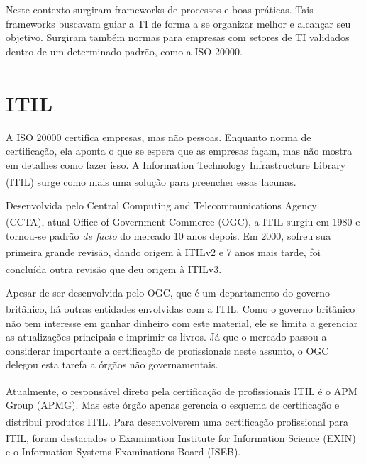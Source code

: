 Neste contexto surgiram frameworks de processos e boas práticas. Tais
frameworks buscavam guiar a TI de forma a se organizar melhor e alcançar seu
objetivo. Surgiram também normas para empresas com setores de TI validados
dentro de um determinado padrão, como a ISO 20000.
%

\section{ITIL\textsuperscript{\textregistered}}
\label{sec:intro:itil}

A ISO 20000 certifica empresas, mas não pessoas. Enquanto norma de
certificação, ela aponta o que se espera que as empresas façam, mas não mostra
em detalhes como fazer isso. A Information Technology Infrastructure Library
(ITIL\textsuperscript{\textregistered}) surge como mais uma solução para
preencher essas lacunas.
%

Desenvolvida pelo Central Computing and Telecommunications Agency\\ (CCTA),
atual Office of Government Commerce (OGC), a
ITIL\textsuperscript{\textregistered} surgiu em 1980 e tornou-se padrão
\emph{de facto} do mercado 10 anos depois. Em 2000, sofreu sua primeira grande
revisão, dando origem à ITIL\textsuperscript{\textregistered}v2 e 7 anos mais
tarde, foi concluída outra revisão que deu origem à
ITIL\textsuperscript{\textregistered}v3.
%
%

Apesar de ser desenvolvida pelo OGC, que é um departamento do governo
britânico, há outras entidades envolvidas com a
ITIL\textsuperscript{\textregistered}. Como o governo britânico não tem
interesse em ganhar dinheiro com este material, ele se limita a gerenciar as
atualizações principais e imprimir os livros. Já que o mercado passou a
considerar importante a certificação de profissionais neste assunto, o OGC
delegou esta tarefa a órgãos não governamentais.

Atualmente, o responsável direto pela certificação de profissionais
ITIL\textsuperscript{\textregistered} é o APM Group (APMG). Mas este órgão
apenas gerencia o esquema de certificação e distribui produtos
ITIL\textsuperscript{\textregistered}. Para desenvolverem uma certificação
profissional para ITIL\textsuperscript{\textregistered}, foram destacados o
Examination Institute for Information Science (EXIN) e o Information Systems
Examinations Board (ISEB).
%
%
%

